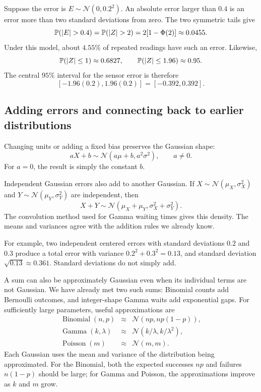 \begin{example}
Suppose the error is \(E\sim\mathcal N(0,0.2^2)\). An absolute error
larger than \(0.4\) is an error more than two standard deviations from
zero. The two symmetric tails give
\[
  \Prob(|E|>0.4)
  =\Prob(|Z|>2)
  =2[1-\Phi(2)]\approx0.0455.
\]
Under this model, about \(4.55\%\) of repeated readings have such an error.
Likewise,
\[
  \mathbb{P}(|Z|\le1)\approx0.6827,\qquad
  \mathbb{P}(|Z|\le1.96)\approx0.95.
\]
The central \(95\%\) interval for the sensor error is therefore
\[
  [-1.96(0.2),1.96(0.2)]=[-0.392,0.392].
\]
\end{example}

\subsection{Adding errors and connecting back to earlier distributions}

Changing units or adding a fixed bias preserves the Gaussian shape:
\[
  aX+b\sim\mathcal N(a\mu+b,a^2\sigma^2),\qquad a\ne0.
\]
For \(a=0\), the result is simply the constant \(b\).

Independent Gaussian errors also add to another Gaussian. If
\(X\sim\mathcal N(\mu_X,\sigma_X^2)\) and
\(Y\sim\mathcal N(\mu_Y,\sigma_Y^2)\) are independent, then
\[
  X+Y\sim\mathcal N(\mu_X+\mu_Y,\sigma_X^2+\sigma_Y^2).
\]
The convolution method used for Gamma waiting times gives this density.
The means and variances agree with the addition rules we already know.

For example, two independent centered errors with standard deviations
\(0.2\) and \(0.3\) produce a total error with variance
\(0.2^2+0.3^2=0.13\), and standard deviation \(\sqrt{0.13}\approx0.361\).
Standard deviations do not simply add.

A sum can also be approximately Gaussian even when its individual terms
are not Gaussian. We have already met two such sums: Binomial counts
add Bernoulli outcomes, and integer-shape Gamma waits add exponential
gaps. For sufficiently large parameters, useful approximations are
\[
  \begin{array}{rcl}
    \operatorname{Binomial}(n,p)
      &\approx&\mathcal N(np,np(1-p)),\\
    \operatorname{Gamma}(k,\lambda)
      &\approx&\mathcal N(k/\lambda,k/\lambda^2),\\
    \operatorname{Poisson}(m)
      &\approx&\mathcal N(m,m).
  \end{array}
\]
Each Gaussian uses the mean and variance of the distribution being
approximated. For the Binomial, both the expected successes \(np\)
and failures \(n(1-p)\) should be large; for Gamma and Poisson, the
approximations improve as \(k\) and \(m\) grow.

